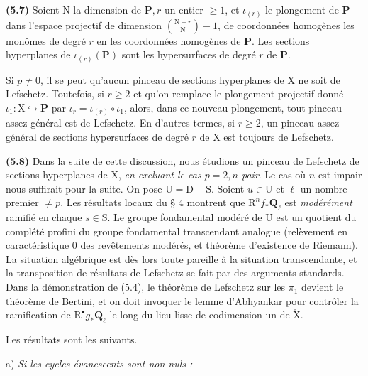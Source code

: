 \documentclass[10pt,leqno]{article}
\begin{document}
\noindent \textbf{(5.7)} Soient \(\mathrm{N}\) la dimension de \(\mathbf{P}, r\) un entier \(\geq 1\), et \(\iota _{(r)}\) le plongement de \(\mathbf{P}\) dans l’espace projectif de dimension \(\binom{\mathrm{N}+r}{\mathrm{N}}- 1\), de coordonnées homogènes les monômes de degré \(r\) en les coordonnées homogènes de \(\mathbf{P}\). Les sections hyperplanes de \(\iota _{(r)}(\mathbf{P})\) sont les hypersurfaces de degré \(r\) de \(\mathbf{P}\).\par

\noindent Si \(p\ne 0\), il se peut qu’aucun pinceau de sections hyperplanes de \(\mathrm{X}\) ne soit de Lefschetz. Toutefois, si \(r\geq 2\) et qu’on remplace le plongement projectif donné \(\iota _{1}:\mathrm{X}\hookrightarrow \mathbf{P}\) par \(\iota _{r}=\iota _{(r)}\circ \iota _{1}\), alors, dans ce nouveau plongement, tout pinceau assez général est de Lefschetz. En d’autres termes, si \(r\geq 2\), un pinceau assez général de sections hypersurfaces de degré \(r\) de \(\mathrm{X}\) est toujours de Lefschetz.\par

\noindent \textbf{(5.8)} Dans la suite de cette discussion, nous étudions un pinceau de Lefschetz de sections hyperplanes de \(\mathrm{X}\), \emph{en excluant le cas \(p=2, n\) pair}. Le cas où \(n\) est impair nous suffirait pour la suite. On pose \(\mathrm{U}=\mathrm{D}- \mathrm{S}\). Soient \(u\in \mathrm{U}\) et \(\ell \) un nombre premier \(\ne p\). Les résultats locaux du § 4 montrent que \(\mathrm{R}^{n} f_{*}\mathbf{Q}_{\ell }\) est \emph{modérément} ramifié en chaque \(s\in \mathrm{S}\). Le groupe fondamental modéré de \(\mathrm{U}\) est un quotient du complété profini du groupe fondamental transcendant analogue (relèvement en caractéristique 0 des revêtements modérés, et théorème d’existence de Riemann). La situation algébrique est dès lors toute pareille à la situation transcendante, et la transposition de résultats de Lefschetz se fait par des arguments standards. Dans la démonstration de (5.4), le théorème de Lefschetz sur les \(\pi _{1}\) devient le théorème de Bertini, et on doit invoquer le lemme d’Abhyankar pour contrôler la ramification de \(\mathrm{R}^{\bullet} g_{*}\mathbf{Q}_{\ell }\) le long du lieu lisse de codimension un de \(\check{\mathrm{X}}\).\par

\noindent Les résultats sont les suivants.\par

\noindent a) \emph{Si les cycles évanescents sont non nuls :}\par
\end{document}

